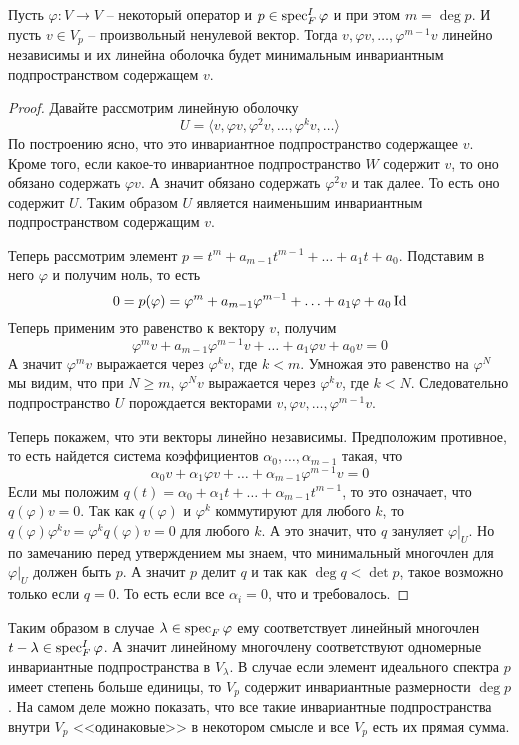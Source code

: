 \begin{claim}
Пусть $\varphi\colon V\to V$ -- некоторый оператор и $p\in \operatorname{spec}^I_F\varphi$ и при этом $m = \deg p$.
И пусть $v\in V_p$ -- произвольный ненулевой вектор.
Тогда $v,\varphi v,\ldots, \varphi^{m-1}v$ линейно независимы и их линейна оболочка будет минимальным инвариантным подпространством содержащем $v$.
\end{claim}
\begin{proof}
Давайте рассмотрим линейную оболочку
\[
U = \langle v, \varphi v, \varphi^2 v, \ldots, \varphi^k v, \ldots\rangle
\]
По построению ясно, что это инвариантное подпространство содержащее $v$.
Кроме того, если какое-то инвариантное подпространство $W$ содержит $v$, то оно обязано содержать $\varphi v$.
А значит обязано содержать $\varphi^2 v$ и так далее.
То есть оно содержит $U$.
Таким образом $U$ является наименьшим инвариантным подпространством содержащим $v$.

Теперь рассмотрим элемент $p = t^m + a_{m-1}t^{m-1} + \ldots + a_1 t + a_0$.
Подставим в него $\varphi$ и получим ноль, то есть
\[
0 = p(\varphi) = \varphi^m + a_{m-1} \varphi^{m-1} + \ldots + a_1 \varphi + a_0 \operatorname{Id}
\]
Теперь применим это равенство к вектору $v$, получим
\[
\varphi^mv + a_{m-1} \varphi^{m-1}v + \ldots + a_1 \varphi v + a_0 v = 0
\]
А значит $\varphi^m v$ выражается через $\varphi^k v$, где $k < m$.
Умножая это равенство на $\varphi^N$ мы видим, что при $N \geqslant m$, $\varphi^N v$ выражается через $\varphi^k v$, где $k < N$.
Следовательно подпространство $U$ порождается векторами $v, \varphi v, \ldots, \varphi^{m-1} v$.

Теперь покажем, что эти векторы линейно независимы.
Предположим противное, то есть найдется система коэффициентов $\alpha_0,\ldots, \alpha_{m-1}$ такая, что
\[
\alpha_0 v + \alpha_1 \varphi v + \ldots + \alpha_{m-1} \varphi^{m-1} v = 0
\]
Если мы положим $q(t) = \alpha_0 + \alpha_1 t + \ldots + \alpha_{m-1} t^{m-1}$, то это означает, что $q(\varphi)v = 0$.
Так как $q(\varphi)$ и $\varphi^k$ коммутируют для любого $k$, то $q(\varphi) \varphi^k v = \varphi^k q(\varphi) v = 0$ для любого $k$.
А это значит, что $q$ зануляет $\varphi|_U$.
Но по замечанию перед утверждением мы знаем, что минимальный многочлен для $\varphi|_U$ должен быть $p$.
А значит $p$ делит $q$ и так как $\deg q < \det p$, такое возможно только если $q = 0$.
То есть если все $\alpha_i = 0$, что и требовалось.
\end{proof}

Таким образом в случае $\lambda \in \operatorname{spec}_F \varphi$ ему соответствует линейный многочлен $t - \lambda \in \operatorname{spec}^I_F\varphi$.
А значит линейному многочлену соответствуют одномерные инвариантные подпространства в $V_\lambda$.
В случае если элемент идеального спектра $p$ имеет степень больше единицы, то $V_p$ содержит инвариантные размерности $\deg p$.
На самом деле можно показать, что все такие инвариантные подпространства внутри $V_p$ <<одинаковые>> в некотором смысле и все $V_p$ есть их прямая сумма.

